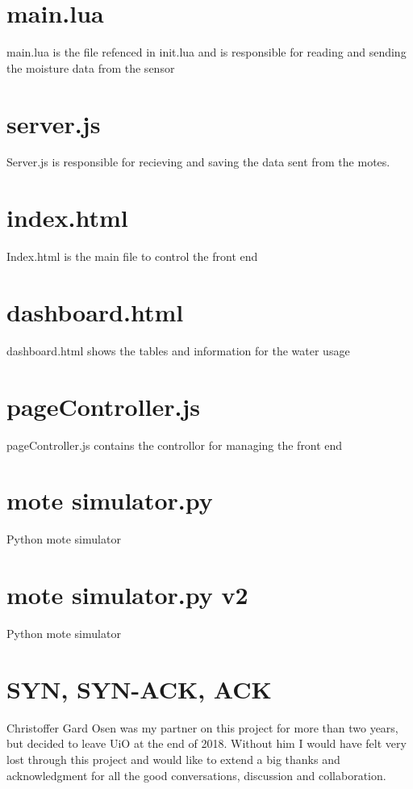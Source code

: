 \documentclass[]{uiophd}
\begin{document}
\section*{main.lua}
main.lua is the file refenced in init.lua and is responsible for reading and sending the moisture data from the sensor


\section*{server.js}
Server.js is responsible for recieving and saving the data sent from the motes.


\section*{index.html}
Index.html is the main file to control the front end


\section*{dashboard.html}
dashboard.html shows the tables and information for the water usage


\section*{pageController.js}
pageController.js contains the controllor for managing the front end


\section*{mote simulator.py}
Python mote simulator


\section*{mote simulator.py v2}
Python mote simulator

\section*{SYN, SYN-ACK, ACK}
Christoffer Gard Osen was my partner on this project for more than two years, but decided to leave UiO at the end of 2018. Without him I would have felt very lost through this project and would like to extend a big thanks and acknowledgment for all the good conversations, discussion and collaboration.
\end{document}
